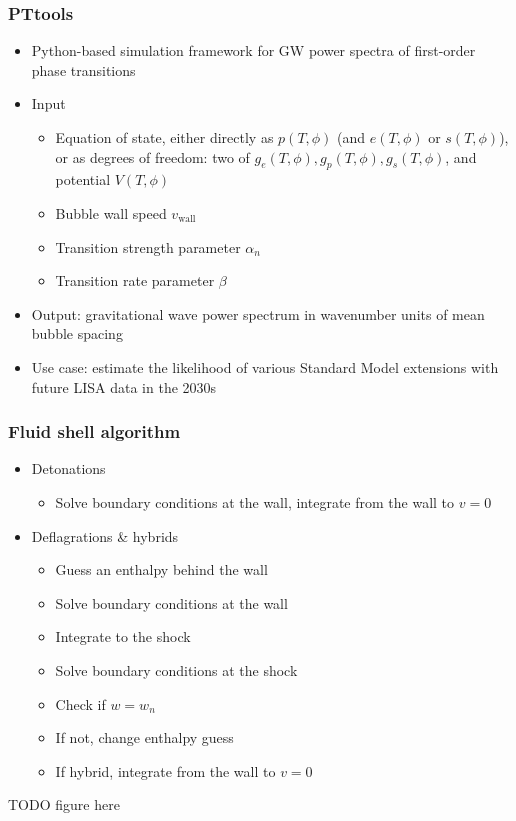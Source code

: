 \begin{frame}
    \frametitle{PTtools}
    \begin{itemize}
        \item Python-based simulation framework for GW power spectra of first-order phase transitions
        \item Input
        \begin{itemize}
            \item Equation of state, either directly as $p(T,\phi)$ (and $e(T,\phi)$ or $s(T,\phi)$),
                or as degrees of freedom: two of $g_e(T,\phi), g_p(T,\phi), g_s(T,\phi)$, and potential $V(T, \phi)$
            \item Bubble wall speed $v_\text{wall}$
            \item Transition strength parameter $\alpha_n$
            \item Transition rate parameter $\beta$
        \end{itemize}
        \item Output: gravitational wave power spectrum in wavenumber units of mean bubble spacing
        \item Use case: estimate the likelihood of various Standard Model extensions with future LISA data in the 2030s
    \end{itemize}
\end{frame}

\begin{frame}
    \frametitle{Fluid shell algorithm}
    \begin{minipage}[t]{0.48\linewidth}%
        \begin{itemize}
            \item Detonations
            \begin{itemize}
                \item Solve boundary conditions at the wall, integrate from the wall to $v=0$
            \end{itemize}
            \item Deflagrations \& hybrids
            \begin{itemize}
                \item Guess an enthalpy behind the wall
                \item Solve boundary conditions at the wall
                \item Integrate to the shock
                \item Solve boundary conditions at the shock
                \item Check if $w=w_n$
                \item If not, change enthalpy guess
                \item If hybrid, integrate from the wall to $v=0$
            \end{itemize}%
        \end{itemize}%
    \end{minipage}%
    \hfill%
    \begin{minipage}[t]{0.48\linewidth}%
        TODO figure here
    \end{minipage}
\end{frame}

